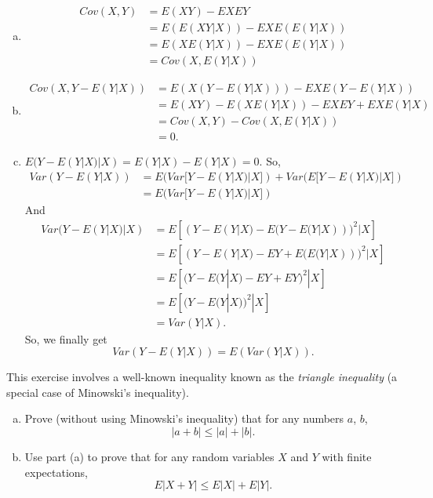 \documentclass[14pt]{elegantbook}
\begin{document}
    \begin{solution}
        \begin{enumerate}[(a)]
            \item \begin{align*}
                Cov(X, Y)&=E(XY)-EXEY\\
                &=E(E(XY|X))-EXE(E(Y|X))\\
                &=E(XE(Y|X))-EXE(E(Y|X))\\
                &=Cov(X, E(Y|X))
            \end{align*}
            \item \begin{align*}
                Cov(X, Y-E(Y|X))&=E(X(Y-E(Y|X)))-EXE(Y-E(Y|X))\\
                &=E(XY)-E(XE(Y|X))-EXEY+EXE(Y|X)\\
                &=Cov(X, Y)-Cov(X, E(Y|X))\\
                &=0.
            \end{align*}
            \item \(E(Y-E(Y|X)|X)=E(Y|X)-E(Y|X)=0\). So, 
            \begin{align*}
                Var(Y-E(Y|X))
                &=E(Var[Y-E(Y|X)|X])+Var(E[Y-E(Y|X)|X])\\
                &=E(Var[Y-E(Y|X)|X])
            \end{align*}
            And \begin{align*}
                Var(Y-E(Y|X)|X)&=E[(Y-E(Y|X)-E(Y-E(Y|X)))^2|X]\\
                &=E[(Y-E(Y|X)-EY+E(E(Y|X)))^2|X]\\
                &=E[(Y-E(Y|X)-EY+EY)^2|X]\\
                &=E[(Y-E(Y|X))^2|X]\\
                &=Var(Y|X).
            \end{align*}
            So, we finally get 
            \[Var(Y-E(Y|X))=E(Var(Y|X)). \]
        \end{enumerate}
    \end{solution}

    \setcounter{exer}{63}
    \begin{exercise}
        This exercise involves a well-known inequality known as the \emph{triangle inequality} (a special case of Minowski's inequality).
        \begin{enumerate}[(a)]
            \item Prove (without using Minowski's inequality) that for any numbers $a$, $b$, 
            \[|a+b|\leq |a|+|b|. \]
            \item Use part (a) to prove that for any random variables $X$ and $Y$ with finite expectations,
            \[E|X+Y|\leq E|X|+E|Y|. \]
        \end{enumerate}
    \end{exercise}
\end{document}
